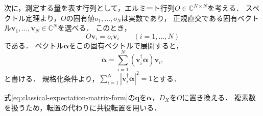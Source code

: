 次に，測定する量を表す行列として，エルミート行列$O\in\mathbb C^{N\times N}$を考える．
スペクトル定理より，$O$の固有値$o_1,\ldots,o_N$は実数であり，
正規直交である固有ベクトル$\bm{v}_1,\ldots,\bm{v}_N \in \mathbb C^N$を選べる．
このとき，
\begin{equation*}
  O\bm{v}_i=o_i\bm{v}_i
  \qquad(i=1,\ldots,N)
\end{equation*}
である．
ベクトル$\bm{\alpha}$をこの固有ベクトルで展開すると，
\begin{equation}
  \bm{\alpha}=\sum_{i=1}^{N} (\bm{v}_i^{\dagger}\bm{\alpha}) \bm{v}_i,
  \label{eq:state-in-observable-eigenbasis}
\end{equation}
と書ける．
規格化条件より，$\sum_{i=1}^{N}|\bm{v}_i^{\dagger}\bm{\alpha}|^2=1$とする．

式\eqref{eq:classical-expectation-matrix-form}の$\bm{q}$を$\bm{\alpha}$，$D_X$を$O$に置き換える．
複素数を扱うため，転置の代わりに共役転置を用いる．


